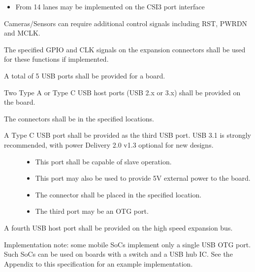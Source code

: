 \documentclass[a4paper,10pt,oneside,english]{sphinxmanual}
\begin{document}
\begin{description}
\begin{itemize}
\item {} 
\sphinxAtStartPar
From 1\sphinxhyphen{}4 lanes may be implemented on the CSI3 port interface

\end{itemize}

\sphinxAtStartPar
Cameras/Sensors can require additional control signals including RST, PWRDN and MCLK.

\sphinxAtStartPar
The specified GPIO and CLK signals on the expansion connectors shall be used for these functions if implemented.

\end{description}

\sphinxAtStartPar
{}

\sphinxAtStartPar
A total of 5 USB ports shall be provided for a board.

\sphinxAtStartPar
Two Type A or Type C USB host ports (USB 2.x or 3.x) shall be provided on the board.

\sphinxAtStartPar
The connectors shall be in the specified locations.
\begin{description}
\item[{A Type C USB port shall be provided as the third USB port. USB 3.1 is strongly recommended, with power Delivery 2.0 v1.3 optional for new designs.}] \leavevmode\begin{itemize}
\item {} 
\sphinxAtStartPar
This port shall be capable of slave operation.

\item {} 
\sphinxAtStartPar
This port may also be used to provide 5V external power to the board.

\item {} 
\sphinxAtStartPar
The connector shall be placed in the specified location.

\item {} 
\sphinxAtStartPar
The third port may be an OTG port.

\end{itemize}

\end{description}

\sphinxAtStartPar
A fourth USB host port shall be provided on the high speed expansion bus.

\sphinxAtStartPar
Implementation note: some mobile SoCs implement only a single USB OTG port. Such SoCs can be used on boards with a switch and a USB hub IC. See the Appendix to this specification for an example implementation.
\end{document}
